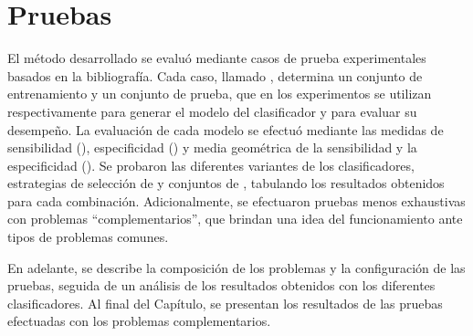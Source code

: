%
%
%
%
\setcounter{chapter}{3}
%
\chapter{Pruebas}
%
El método desarrollado se evaluó mediante casos de prueba
experimentales basados en la bibliografía.
Cada caso, llamado , determina un conjunto de
entrenamiento y un conjunto de prueba, que en los experimentos se
utilizan respectivamente para generar el modelo del clasificador y
para evaluar su desempeño.
La evaluación de cada modelo se efectuó mediante las medidas de
sensibilidad (\SE), especificidad (\SP) y media geométrica de la
sensibilidad y la especificidad (\GM).
Se probaron las diferentes variantes de los clasificadores,
estrategias de selección de  y conjuntos de ,
tabulando los resultados obtenidos para cada combinación.
Adicionalmente, se efectuaron pruebas menos exhaustivas con problemas
``complementarios'', que brindan una idea del funcionamiento ante
tipos de problemas comunes.

En adelante, se describe la composición de los problemas y la
configuración de las pruebas, seguida de un análisis de los resultados
obtenidos con los diferentes clasificadores.
Al final del Capítulo, se presentan los resultados de las pruebas
efectuadas con los problemas complementarios.
